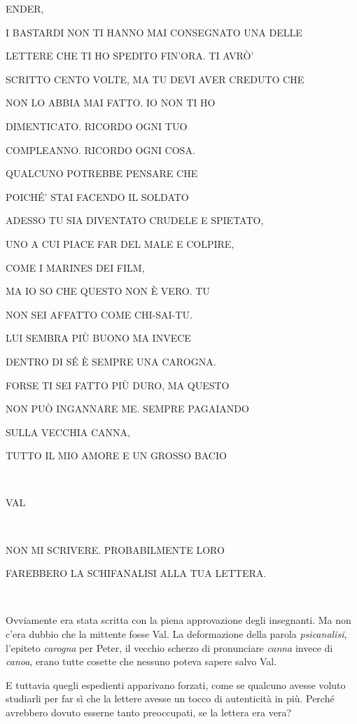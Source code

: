 \begin{flushleft}
	{\footnotesize {ENDER,

{I BASTARDI NON TI HANNO MAI CONSEGNATO UNA DELLE}

{LETTERE CHE TI HO SPEDITO FIN'ORA. TI AVRÒ'}

{SCRITTO CENTO VOLTE, MA TU DEVI AVER CREDUTO CHE}

{NON LO ABBIA MAI FATTO. IO NON TI HO}

{DIMENTICATO. RICORDO OGNI TUO}

{COMPLEANNO. RICORDO OGNI COSA.}

{QUALCUNO POTREBBE PENSARE CHE}

{POICHÉ' STAI FACENDO IL SOLDATO}

{ADESSO TU SIA DIVENTATO CRUDELE E SPIETATO,}

{UNO A CUI PIACE FAR DEL MALE E COLPIRE,}

{COME I MARINES DEI FILM,}

{MA IO SO CHE QUESTO NON È VERO. TU}

{NON SEI AFFATTO COME CHI-SAI-TU.}

{LUI SEMBRA PIÙ BUONO MA INVECE}

{DENTRO DI SÉ È SEMPRE UNA CAROGNA.}

{FORSE TI SEI FATTO PIÙ DURO, MA QUESTO}

{NON PUÒ INGANNARE ME. SEMPRE PAGAIANDO}

{SULLA VECCHIA CANNA,}

{TUTTO IL MIO AMORE E UN GROSSO BACIO}

{~}

{VAL}

{~}

{NON MI SCRIVERE. PROBABILMENTE LORO}

{FAREBBERO LA SCHIFANALISI ALLA TUA LETTERA.}

{~}

}


}
\end{flushleft}

{Ovviamente era stata scritta con la piena approvazione degli
	insegnanti. Ma non c'era dubbio che la mittente fosse Val. La
	deformazione della parola \emph{psicanalisi}, \emph{} l'epiteto
	\emph{carogna} per Peter, il vecchio scherzo di pronunciare \emph{canna}
	invece di \emph{canoa}, \emph{} erano tutte cosette che nessuno poteva
	sapere salvo Val.}

{E tuttavia quegli espedienti apparivano forzati, come se qualcuno
	avesse voluto studiarli per far sì che la lettere avesse un tocco di
	autenticità in più. Perché avrebbero dovuto esserne tanto preoccupati,
	se la lettera era vera?}

